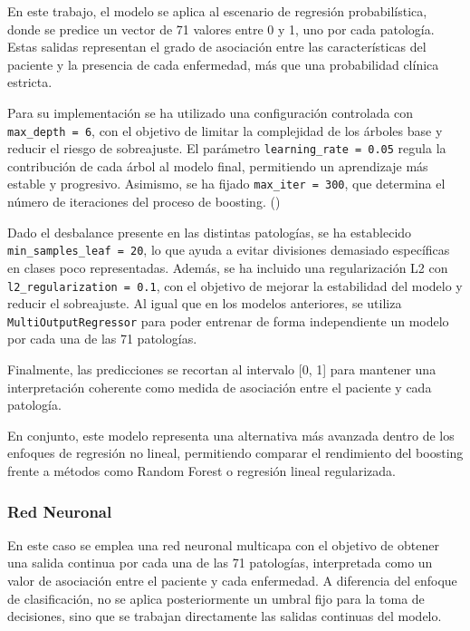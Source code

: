 \documentclass[12pt,a4paper,twoside]{book}
\begin{document}
En este trabajo, el modelo se aplica al escenario de regresión probabilística, donde se predice un vector de 71 valores entre 0 y 1, uno por cada patología. 
Estas salidas representan el grado de asociación entre las características del paciente y la presencia de cada enfermedad, más que una probabilidad clínica estricta.

Para su implementación se ha utilizado una configuración controlada con \texttt{max\_depth = 6}, con el objetivo de limitar la complejidad de los árboles base y reducir el riesgo de sobreajuste. 
El parámetro \texttt{learning\_rate = 0.05} regula la contribución de cada árbol al modelo final, permitiendo un aprendizaje más estable y progresivo. 
Asimismo, se ha fijado \texttt{max\_iter = 300}, que determina el número de iteraciones del proceso de boosting. (\cite{sklearn_histgbr})

Dado el desbalance presente en las distintas patologías, se ha establecido \texttt{min\_samples\_leaf = 20}, lo que ayuda a evitar divisiones demasiado específicas en clases poco representadas. 
Además, se ha incluido una regularización L2 con \texttt{l2\_regularization = 0.1}, con el objetivo de mejorar la estabilidad del modelo y reducir el sobreajuste.
Al igual que en los modelos anteriores, se utiliza \texttt{MultiOutputRegressor} para poder entrenar de forma independiente un modelo por cada una de las 71 patologías.

Finalmente, las predicciones se recortan al intervalo [0, 1] para mantener una interpretación coherente como medida de asociación entre el paciente y cada patología.

En conjunto, este modelo representa una alternativa más avanzada dentro de los enfoques de regresión no lineal, permitiendo comparar el rendimiento del boosting frente a métodos como Random Forest o regresión lineal regularizada.

\subsubsection*{Red Neuronal}

En este caso se emplea una red neuronal multicapa con el objetivo de obtener una salida continua por cada una de las 71 patologías, interpretada como un valor de asociación entre el paciente y cada enfermedad. 
A diferencia del enfoque de clasificación, no se aplica posteriormente un umbral fijo para la toma de decisiones, sino que se trabajan directamente las salidas continuas del modelo.
\end{document}
